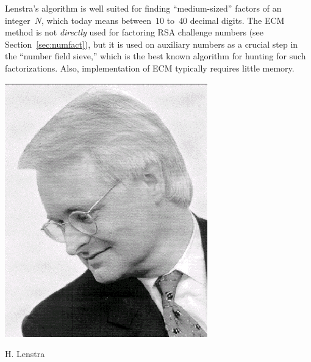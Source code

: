 \vspace{3ex}
\noindent\begin{minipage}[b]{.67\linewidth}
  Lenstra's algorithm is well suited for finding ``medium-sized''
  factors of an integer~$N$, which today means between~$10$ to~$40$ decimal
  digits.  The ECM method is not {\em directly} used for factoring
  RSA challenge numbers (see Section~\ref{sec:numfact}), but it is
  used on auxiliary numbers as a crucial step in the ``number field
  sieve,'' which is the best known algorithm for hunting for such
  factorizations.  Also, implementation of ECM typically requires little
  memory.
\end{minipage}\hspace{.05\linewidth}
\begin{minipage}[b]{.25\linewidth}
\noindent\includegraphics[width=\textwidth]{graphics/lenstra}
\vspace{-3ex}
\begin{center}
H. Lenstra
\end{center}
\end{minipage}
\vspace{-2ex}


